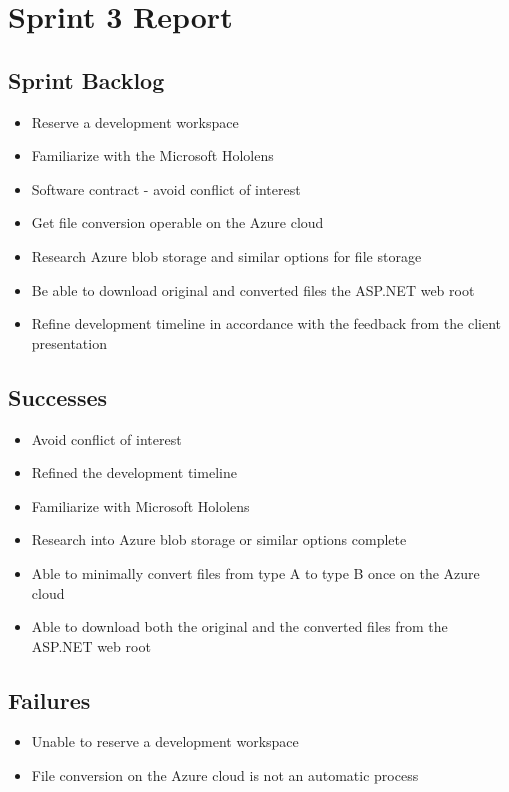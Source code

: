 
\section{Sprint 3 Report}
\label{sec:Sprint3_report}
    \subsection{Sprint Backlog}
    \label{sec:Sprint3_backlog}
        \begin{itemize}
            \item Reserve a development workspace
            \item Familiarize with the Microsoft Hololens
            \item Software contract - avoid conflict of interest
            \item Get file conversion operable on the Azure cloud
            \item Research Azure blob storage and similar options for file storage
            \item Be able to download original and converted files the ASP.NET web root
            \item Refine development timeline in accordance with the feedback from the client presentation            
        \end{itemize}

    \subsection{Successes}
    \label{sec:Sprint3_successes}
        \begin{itemize}
            \item Avoid conflict of interest
            \item Refined the development timeline
            \item Familiarize with Microsoft Hololens
            \item Research into Azure blob storage or similar options complete
            \item Able to minimally convert files from type A to type B once on the Azure cloud
            \item Able to download both the original and the converted files from the ASP.NET web root
        \end{itemize}

    \subsection{Failures}
    \label{sec:Sprint3_failures}
        \begin{itemize}
            \item Unable to reserve a development workspace
            \item File conversion on the Azure cloud is not an automatic process
        \end{itemize}


